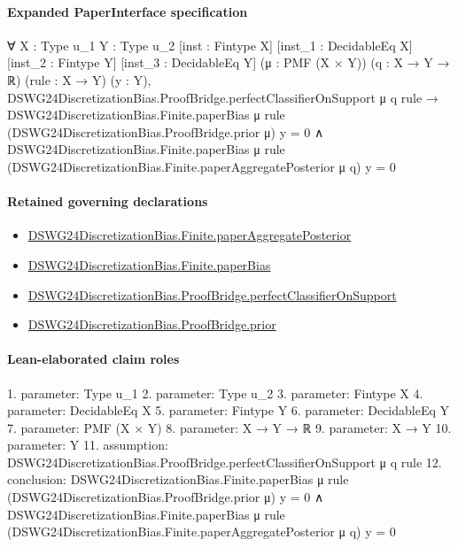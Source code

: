 \documentclass[10pt]{article}
\begin{document}
\paragraph{Expanded PaperInterface specification}
\begin{ReviewVerbatim}
∀ {X : Type u_1} {Y : Type u_2} [inst : Fintype X] [inst_1 : DecidableEq X] [inst_2 : Fintype Y]
  [inst_3 : DecidableEq Y] (μ : PMF (X × Y)) (q : X → Y → ℝ) (rule : X → Y) (y : Y),
  DSWG24DiscretizationBias.ProofBridge.perfectClassifierOnSupport μ q rule →
    DSWG24DiscretizationBias.Finite.paperBias μ rule (DSWG24DiscretizationBias.ProofBridge.prior μ) y = 0 ∧
      DSWG24DiscretizationBias.Finite.paperBias μ rule (DSWG24DiscretizationBias.Finite.paperAggregatePosterior μ q) y =
        0
\end{ReviewVerbatim}

\paragraph{Retained governing declarations}
\begin{itemize}\raggedright
\item \hyperlink{governing-declaration-7bdd5ebec3f67e16}{DSWG24\allowbreak{}Discretization\allowbreak{}Bias.\allowbreak{}Finite.\allowbreak{}paper\allowbreak{}Aggregate\allowbreak{}Posterior}
\item \hyperlink{governing-declaration-5d2200dbd9b4b93d}{DSWG24\allowbreak{}Discretization\allowbreak{}Bias.\allowbreak{}Finite.\allowbreak{}paper\allowbreak{}Bias}
\item \hyperlink{governing-declaration-28e1fcee264c130f}{DSWG24\allowbreak{}Discretization\allowbreak{}Bias.\allowbreak{}Proof\allowbreak{}Bridge.\allowbreak{}perfect\allowbreak{}Classifier\allowbreak{}On\allowbreak{}Support}
\item \hyperlink{governing-declaration-8260e4a6984dc105}{DSWG24\allowbreak{}Discretization\allowbreak{}Bias.\allowbreak{}Proof\allowbreak{}Bridge.\allowbreak{}prior}
\end{itemize}
\paragraph{Lean-elaborated claim roles}\begin{ReviewVerbatim}
1. parameter: Type u_1
2. parameter: Type u_2
3. parameter: Fintype X
4. parameter: DecidableEq X
5. parameter: Fintype Y
6. parameter: DecidableEq Y
7. parameter: PMF (X × Y)
8. parameter: X → Y → ℝ
9. parameter: X → Y
10. parameter: Y
11. assumption: DSWG24DiscretizationBias.ProofBridge.perfectClassifierOnSupport μ q rule
12. conclusion: DSWG24DiscretizationBias.Finite.paperBias μ rule (DSWG24DiscretizationBias.ProofBridge.prior μ) y = 0 ∧
  DSWG24DiscretizationBias.Finite.paperBias μ rule (DSWG24DiscretizationBias.Finite.paperAggregatePosterior μ q) y = 0
\end{ReviewVerbatim}
\end{document}
